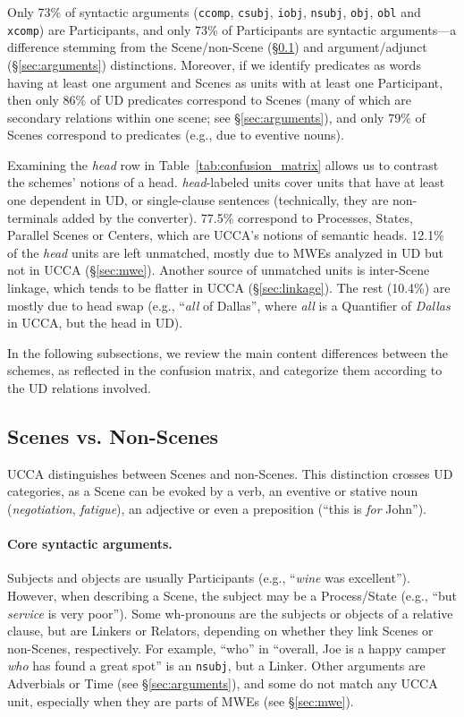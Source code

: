 \documentclass[11pt,a4paper,table]{article}
\begin{document}
Only 73\% of syntactic arguments
(\texttt{ccomp}, \texttt{csubj}, \texttt{iobj}, \texttt{nsubj}, \texttt{obj}, \texttt{obl} and \texttt{xcomp})
are Participants,
and only 73\% of Participants are syntactic arguments---a difference stemming from
the Scene/non-Scene (\S\ref{sec:s}) and argument/adjunct (\S\ref{sec:arguments}) distinctions.
Moreover, if we identify predicates as words having at least one argument
and Scenes as units with at least one Participant,
then only 86\% of UD predicates correspond to Scenes (many of which are secondary relations within one scene; see \S\ref{sec:arguments}),
and only 79\% of Scenes correspond to predicates (e.g., due to eventive nouns).

Examining the {\it head} row in Table~\ref{tab:confusion_matrix} allows
us to contrast the schemes' notions of a head. 
{\it head}-labeled units cover units that have at least
one dependent in UD, or single-clause sentences (technically, they are non-terminals added by the converter).
77.5\% correspond to Processes, States, Parallel Scenes or Centers,
which are UCCA's notions of semantic heads.
12.1\% of the {\it head} units are left unmatched, mostly due to MWEs analyzed in
UD but not in UCCA (\S\ref{sec:mwe}).
Another source of unmatched units is inter-Scene linkage, which tends to be flatter in
UCCA (\S\ref{sec:linkage}).
The rest (10.4\%) are mostly due to head swap (e.g., ``\textit{all} of Dallas'', where \textit{all}
is a Quantifier of \textit{Dallas} in UCCA, but the head in UD).

In the following subsections, we review the main content differences between the schemes,
as reflected in the confusion matrix, and categorize them according to the UD relations
involved.

\subsection{Scenes vs. Non-Scenes}\label{sec:s}

UCCA distinguishes between Scenes and non-Scenes.
This distinction crosses UD categories,
as a Scene can be evoked by a verb, an eventive or stative
noun (\textit{negotiation}, \textit{fatigue}),
an adjective or even a preposition (``this is \textit{for} John'').

\paragraph{Core syntactic arguments.}
      Subjects and objects are usually Participants (e.g., ``\textit{wine} was excellent'').
      However, when describing a Scene, the subject may be a Process/State
      (e.g., ``but \textit{service} is very poor'').
      Some wh-pronouns are the subjects or objects of a relative clause, but
      are Linkers or Relators,
      depending on whether they link Scenes or non-Scenes, respectively.
      For example, ``who'' in ``overall, Joe is a happy camper \textit{who} has found a great spot'' is an \texttt{nsubj}, but a Linker.
      Other arguments are Adverbials or Time (see \S\ref{sec:arguments}), and
      some do not match any UCCA unit, especially when they are parts of MWEs (see \S\ref{sec:mwe}).
\end{document}
